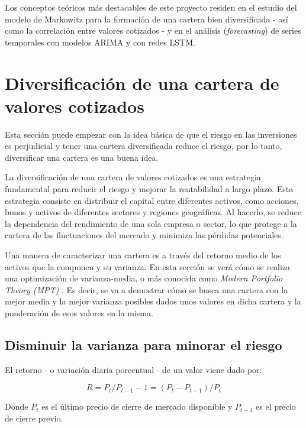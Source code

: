 
Los conceptos teóricos más destacables de este proyecto residen en el estudio del modelo de Markowitz para la formación de una cartera bien diversificada - así como la correlación entre valores cotizados - y  en el análisis (\emph{forecasting}) de series temporales con modelos ARIMA y con redes LSTM. 


\section{Diversificación de una cartera de valores cotizados}\label{diversificar_cartera}

Esta sección puede empezar con la idea básica de que el riesgo en las inversiones es perjudicial y tener una cartera diversificada reduce el riesgo, por lo tanto, diversificar una cartera es una buena idea. 

La diversificación de una cartera de valores cotizados es una estrategia fundamental para reducir el riesgo y mejorar la rentabilidad a largo plazo. Esta estrategia consiste en distribuir el capital entre diferentes activos, como acciones, bonos y activos de diferentes sectores y regiones geográficas. Al hacerlo, se reduce la dependencia del rendimiento de una sola empresa o sector, lo que protege a la cartera de las fluctuaciones del mercado y minimiza las pérdidas potenciales.

Una manera de caracterizar una cartera es a través del retorno medio de los activos que la componen y su varianza. En esta sección se verá cómo se realiza una optimización de varianza-media, o más conocida como \emph{Modern Portfolio Theory (MPT)} \citep{wiki:mpt}. Es decir, se va a demostrar cómo se busca una cartera con la mejor media y la mejor varianza posibles dados unos valores en dicha cartera y la ponderación de esos valores en la misma. 


\subsection{Disminuir la varianza para minorar el riesgo}

El retorno - o variación diaria porcentual - de un valor viene dado por:

\begin{equation}
	R = P_{t}/P_{t-1} - 1 = (P_{t} - P_{t-1})/P_{t}
\end{equation}

Donde $P_{t}$ es el último precio de cierre de mercado disponible y $P_{t-1}$ es el precio de cierre previo. 

